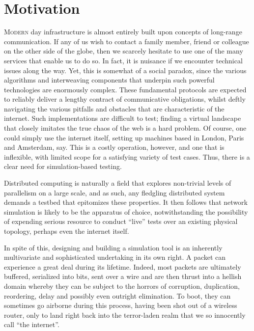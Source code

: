 \section{Motivation}\label{section:motivation}

\lettrine{M}{odern} day infrastructure is almost entirely built upon concepts of long-range communication. If any of
us wish to contact a family member, friend or colleague on the other side of the globe, then we scarcely hesitate to
use one of the many services that enable us to do so. In fact, it is nuisance if we encounter technical issues along
the way. Yet, this is somewhat of a social paradox, since the various algorithms and interweaving components
that underpin such powerful technologies are enormously complex. These fundamental protocols are expected to reliably
deliver a lengthy contract of communicative obligations, whilst deftly navigating the various pitfalls and obstacles
that are characteristic of the internet. Such implementations are difficult to test; finding a virtual
landscape that closely imitates the true chaos of the web is a hard problem. Of course, one could simply use the
internet itself, setting up machines based in London, Paris and Amsterdam, say. This is a costly operation, however,
and one that is inflexible, with limited scope for a satisfying variety of test cases. Thus, there is a clear need for
simulation-based testing.

Distributed computing is naturally a field that explores non-trivial levels of parallelism on a large
scale, and as such, any fledgling distributed system demands a testbed that epitomizes these properties. It then
follows that network simulation is likely to be the apparatus of choice, notwithstanding the possibility of expending
serious resource to conduct ``live'' tests over an existing physical topology, perhaps even the internet itself.

In spite of this, designing and building a simulation tool is an inherently multivariate and sophisticated undertaking
in its own right. A packet can experience a great deal during its lifetime. Indeed, most packets are ultimately
buffered, serialized into bits, sent over a wire and are then thrust into a hellish domain whereby they can be
subject to the horrors of corruption, duplication, reordering, delay and possibly even outright elimination. To boot,
they can sometimes go airborne during this process, having been shot out of a wireless router, only to land right
back into the terror-laden realm that we so innocently call ``the internet''.

